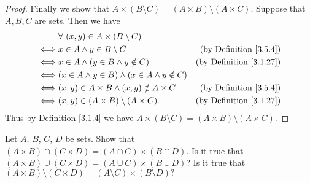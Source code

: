 \begin{proof}
    Finally we show that \(A \times (B \setminus C) = (A \times B) \setminus (A \times C)\).
    Suppose that \(A, B, C\) are sets.
    Then we have
    \begin{align*}
             & \forall\ (x, y) \in A \times (B \setminus C)                                                   \\
        \iff & x \in A \land y \in B \setminus C                        & \text{(by Definition \ref{3.5.4})}  \\
        \iff & x \in A \land (y \in B \land y \notin C)                 & \text{(by Definition \ref{3.1.27})} \\
        \iff & (x \in A \land y \in B) \land (x \in A \land y \notin C)                                       \\
        \iff & (x, y) \in A \times B \land (x, y) \notin A \times C     & \text{(by Definition \ref{3.5.4})}  \\
        \iff & (x, y) \in (A \times B) \setminus (A \times C).          & \text{(by Definition \ref{3.1.27})}
    \end{align*}
    Thus by Definition \ref{3.1.4} we have \(A \times (B \setminus C) = (A \times B) \setminus (A \times C)\).
\end{proof}

\begin{exercise}\label{ex 3.5.5}
    Let \(A\), \(B\), \(C\), \(D\) be sets.
    Show that \((A \times B) \cap (C \times D) = (A \cap C) \times (B \cap D)\).
    Is it true that \((A \times B) \cup (C \times D) = (A \cup C) \times (B \cup D)?\)
    Is it true that \((A \times B) \setminus (C \times D) = (A \setminus C) \times (B \setminus D)?\)
\end{exercise}


